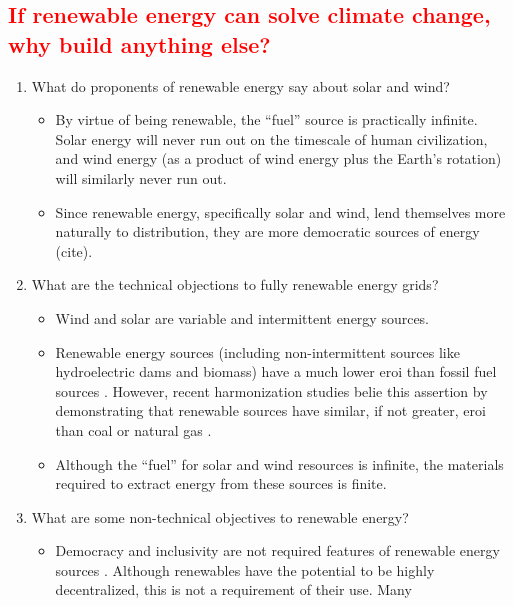 \subsection{\textcolor{red}{If renewable energy can solve climate change, why build anything else?}}

\begin{enumerate}
    \item What do proponents of renewable energy say about solar and wind?
    \begin{itemize}
        \item By virtue of being renewable, the ``fuel'' source is practically infinite. Solar energy will 
        never run out on the timescale of human civilization, and wind energy (as a product of wind energy plus
        the Earth's rotation) will similarly never run out.
        \item Since renewable energy, specifically solar and wind, lend themselves more naturally to distribution,
        they are more democratic sources of energy (cite).
    \end{itemize}
    \item What are the technical objections to fully renewable energy grids?
    \begin{itemize}
        \item Wind and solar are variable and intermittent energy sources.
        \item Renewable energy sources (including non-intermittent sources like hydroelectric dams and biomass) have a much lower \ac{eroi}
        than fossil fuel sources \cite{hall_eroi_2014,weisbach_energy_2013}. However, recent harmonization studies belie this assertion
        by demonstrating that renewable sources have similar, if not greater, \ac{eroi} than coal or natural gas \cite{murphy_energy_2022}.
        \item Although the ``fuel'' for solar and wind resources is infinite, the materials required to extract energy
        from these sources is finite.
    \end{itemize}
    \item What are some non-technical objectives to renewable energy?
    \begin{itemize}
        \item Democracy and inclusivity are not required features of renewable energy sources \cite{bell_toward_2020,winner_artifacts_1980}. 
        Although renewables have the potential to be highly decentralized, this is not a requirement of their use. Many 

\end{itemize}
\end{enumerate}
